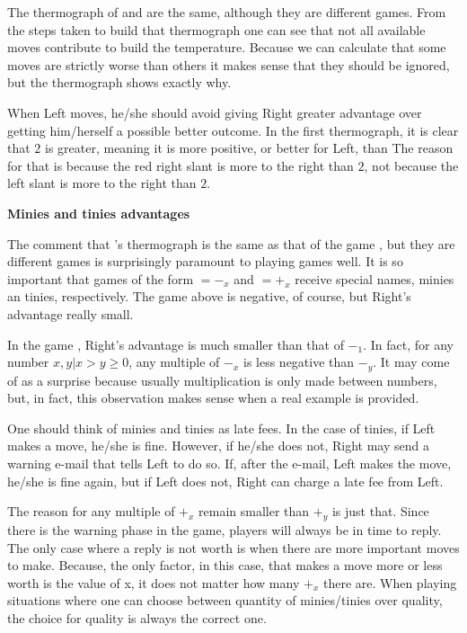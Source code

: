 

The thermograph of \Gm{} and  are the same, although they are different games. From the steps taken to build that thermograph one can see that not all available moves contribute to build the temperature. Because we can calculate that some moves are strictly worse than others it makes sense that they should be ignored, but the thermograph shows exactly why.

When Left moves, he/she should avoid giving Right greater advantage over getting him/herself a possible better outcome. In the first thermograph, it is clear that $2$ is greater, meaning it is more positive, or better for Left, than  The reason for that is because the red right slant is more to the right than $2$, not because the left slant is more to the right than $2$.

\textbf{Minies and tinies advantages}

The comment that \Gm{}'s thermograph is the same as that of the game , but they are different games is surprisingly paramount to playing games well. It is so important that games of the form $=-_x$ and $=+_x$ receive special names, minies an tinies, respectively. The game above is negative, of course, but Right's advantage really small.

In the game , Right's advantage is much smaller than that of $-_1$. In fact, for any number $x,y | x > y \ge 0$, any multiple of $-_x$ is less negative than $-_y$. It may come of as a surprise because usually multiplication is only made between numbers, but, in fact, this observation makes sense when a real example is provided.

One should think of minies and tinies as late fees. In the case of tinies, if Left makes a move, he/she is fine. However, if he/she does not, Right may send a warning e-mail that tells Left to do so. If, after the e-mail, Left makes the move, he/she is fine again, but if Left does not, Right can charge a late fee from Left.

The reason for any multiple of $+_x$ remain smaller than $+_y$ is just that. Since there is the warning phase in the game, players will always be in time to reply. The only case where a reply is not worth is when there are more important moves to make. Because, the only factor, in this case, that makes a move more or less worth is the value of x, it does not matter how many $+_x$ there are. When playing situations where one can choose between quantity of minies/tinies over quality, the choice for quality is always the correct one.

